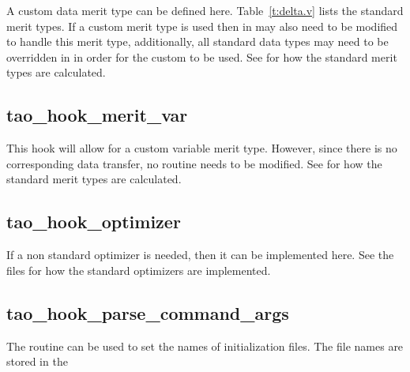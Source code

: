 {A custom data merit type can be defined here. Table~\ref{t:delta.v} lists the standard merit
types. If a custom merit type is used then  in  may also
need to be modified to handle this merit type, additionally, all standard data types may need to be
overridden in  in order for the custom  to be used.  See
 for how the standard merit types are calculated.

\subsection{tao_hook_merit_var}

This hook will allow for a custom variable merit type. However, since there is no corresponding data
transfer, no  routine needs to be modified.  See  for how the standard
merit types are calculated.

\subsection{tao_hook_optimizer}

If a non standard optimizer is needed, then it can be implemented here. See the
 files for how the standard optimizers are implemented.

\subsection{tao_hook_parse_command_args}

The  routine can be used to set the names of initialization
files. The file names are stored in the \vn{s%
following changes the default plot initialization file:
\begin{example}
  s%
\end{example}
Note that if an initialization file name is given on the command line or in the root \tao
initialization file, that name will supersede the hook name.

}}
